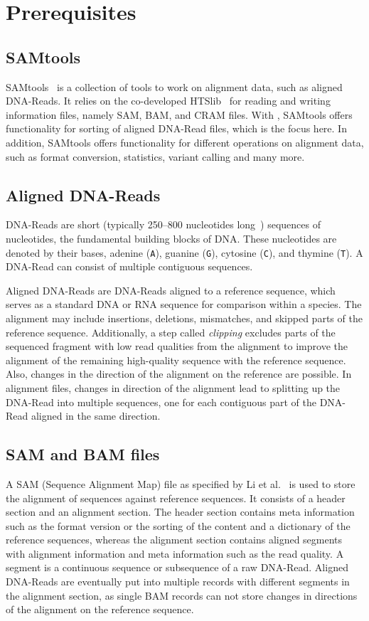 \section{Prerequisites}

\subsection{SAMtools}
SAMtools~\cite{12ySamtools} is a collection of tools to work on alignment data, such as aligned DNA-Reads. It relies on the co-developed HTSlib~\cite{bonfield_htslib_2021} for reading and writing information files, namely SAM, BAM, and CRAM files. With \sort, SAMtools offers functionality for sorting of aligned DNA-Read files, which is the focus here. In addition, SAMtools offers functionality for different operations on alignment data, such as format conversion, statistics, variant calling and many more.

\subsection{Aligned DNA-Reads}
DNA-Reads are short (typically 250–800 nucleotides long~\cite{hu_next-generation_2021}) sequences of nucleotides, the fundamental building blocks of DNA. These nucleotides are denoted by their bases, adenine (\texttt{A}), guanine (\texttt{G}), cytosine (\texttt{C}), and thymine (\texttt{T}). A DNA-Read can consist of multiple contiguous sequences. 

Aligned DNA-Reads are DNA-Reads aligned to a reference sequence, which serves as
a standard DNA or RNA sequence for comparison within a species. The alignment may include insertions, deletions, mismatches, and skipped parts of the reference sequence. Additionally, a step called \textit{clipping} excludes parts of the sequenced fragment with low read qualities from the alignment to improve the alignment of the remaining high-quality sequence with the reference sequence. Also, changes in the direction of the alignment on the reference are possible. In alignment files, changes in direction of the alignment lead to splitting up the DNA-Read into multiple sequences, one for each contiguous part of the DNA-Read aligned in the same direction.

\subsection{SAM and BAM files}
A SAM (Sequence Alignment Map) file as specified by Li et al.~\cite{samformat} is used to store the alignment of sequences against reference sequences. It consists of a header section and an alignment section. The header section contains meta information such as the format version or the sorting of the content and a dictionary of the reference sequences, whereas the alignment section contains aligned segments with alignment information and meta information such as the read quality. A segment is a continuous sequence or subsequence of a raw DNA-Read. Aligned DNA-Reads are eventually put into multiple records with different segments in the alignment section, as single BAM records can not store changes in directions of the alignment on the reference sequence.


